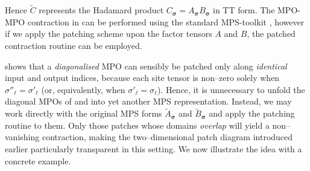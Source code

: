 Hence $\widetilde{C}$ represents the Hadamard product
$C_{\boldsymbol{\sigma}}=A_{\boldsymbol{\sigma}}B_{\boldsymbol{\sigma}}$ in TT form. The MPO-MPO contraction in  can be performed using the standard MPS-toolkit \cite{ITensors.jl, QSpace}, however if we apply the patching scheme upon the factor tensors $A$ and $B$, the patched contraction routine can be employed.

 shows that a \emph{diagonalised} MPO can sensibly be patched only along \emph{identical} input and output indices, because each site tensor is non–zero solely when \(\sigma''_{\ell}=\sigma'_{\ell}\) (or, equivalently, when \(\sigma'_{\ell}=\sigma_{\ell}\)).
Hence, it is unnecessary to unfold the diagonal MPOs of  and  into yet another MPS representation.  
Instead, we may work directly with the original MPS forms
\(\widetilde{A}_{\boldsymbol{\sigma}}\) and
\(\widetilde{B}_{\boldsymbol{\sigma}}\) and apply the patching routine to them.  Only those patches whose domains \emph{overlap} will yield a non–vanishing contraction, making the two–dimensional patch diagram
introduced earlier particularly transparent in this setting. We now illustrate the idea with a concrete example.

